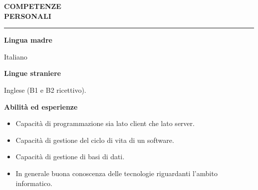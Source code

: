 \hspace{5mm}
\begin{minipage}[b]{0.3\textwidth}
	\textbf{COMPETENZE \\PERSONALI}
\end{minipage}%
\hfill
\hfill
\begin{minipage}[t]{0.6\textwidth}		
	\rule{\textwidth}{0.4pt}
\end{minipage}%
\vspace{5mm}


\begin{minipage}[t]{0.3\textwidth}
	\textbf{Lingua madre}
\end{minipage}%
\hfill
\hfill
\begin{minipage}[t]{0.6\textwidth}		
	Italiano
	\vspace{4mm}
\end{minipage}%


\begin{minipage}[t]{0.3\textwidth}
	\textbf{Lingue straniere}
\end{minipage}%
\hfill
\hfill
\begin{minipage}[t]{0.6\textwidth}		
	Inglese (B1 e B2 ricettivo).
	\vspace{4mm}
\end{minipage}%


\begin{minipage}[t]{0.3\textwidth}
	\textbf{Abilità ed esperienze}
\end{minipage}%
\hfill
\hfill
\begin{minipage}[t]{0.6\textwidth}		
	\begin{itemize}
		\item Capacità di programmazione sia lato client che lato server.
		\item Capacità di gestione del ciclo di vita di un software.
		\item Capacità di gestione di basi di dati.
		\item In generale buona conoscenza delle tecnologie riguardanti l'ambito informatico.
	\end{itemize}
	\vspace{4mm}
\end{minipage}%